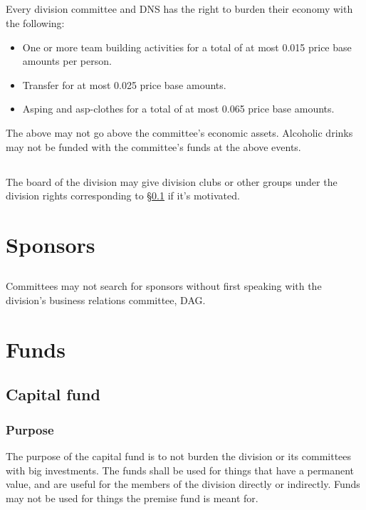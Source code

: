 \documentclass[a4paper]{dtek}
\begin{document}
\subsection{}
\label{sec:internreps}
Every division committee and DNS has the right to burden their economy with the following: 
\begin{itemize}
    \item One or more team building activities for a total of at most 0.015 price base amounts per person.
    \item Transfer for at most 0.025 price base amounts.
    \item Asping and asp-clothes for a total of at most 0.065 price base amounts.
\end{itemize}
The above may not go above the committee's economic assets. Alcoholic drinks may not be funded with the committee's funds at the above events.

\subsection{}
The board of the division may give division clubs or other groups under the division rights corresponding to §\ref{sec:internreps} if it's motivated.

\section{Sponsors}
\subsection{}
Committees may not search for sponsors without first speaking with the division's business relations committee, DAG.

\section{Funds}
\subsection{Capital fund}
\subsubsection{Purpose}
\label{sec:kapitalfond_syfte}
The purpose of the capital fund is to not burden the division or its committees with big investments. The funds shall be used for things that have a permanent value, and are useful for the members of the division directly or indirectly. Funds may not be used for things the premise fund is meant for.
\end{document}

